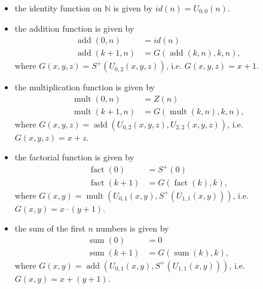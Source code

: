 \documentclass[a4paper, openany]{memoir}
\theoremstyle{definition}
\begin{document}
    \begin{itemize}
        \item the identity function on $\mathbb{N}$ is given by $id(n) = U_{0, 0}(n)$.
        
        \item the addition function is given by
        \begin{align*}
            \operatorname{add}(0, n) &= id(n) \\
            \operatorname{add}(k+1, n) &= G(\operatorname{add}(k, n), k, n),
        \end{align*}
        where $G(x, y, z) = S^+(U_{0, 2}(x, y, z))$, i.e. $G(x, y, z) = x+1$.

        \item the multiplication function is given by
        \begin{align*}
            \operatorname{mult}(0, n) &= Z(n) \\
            \operatorname{mult}(k+1, n) &= G(\operatorname{mult}(k, n), k, n),
        \end{align*}
        where $G(x, y, z) = \operatorname{add}(U_{0, 2}(x, y, z), U_{2, 2}(x, y, z))$, i.e. $G(x, y, z) = x + z$.

        \item the factorial function is given by
        \begin{align*}
            \operatorname{fact}(0) &= S^+(0) \\
            \operatorname{fact}(k+1) &= G(\operatorname{fact}(k), k),
        \end{align*}
        where $G(x, y) = \operatorname{mult}(U_{0, 1}(x, y), S^+(U_{1, 1}(x, y)))$, i.e. $G(x, y) = x \cdot (y+1)$.

        \item the sum of the first $n$ numbers is given by
        \begin{align*}
            \operatorname{sum}(0) &= 0 \\
            \operatorname{sum}(k+1) &= G(\operatorname{sum}(k), k),
        \end{align*}
        where $G(x, y) = \operatorname{add}(U_{0, 1}(x, y), S^+(U_{1, 1}(x, y)))$, i.e. $G(x, y) = x + (y + 1)$.
    \end{itemize}
\end{document}
